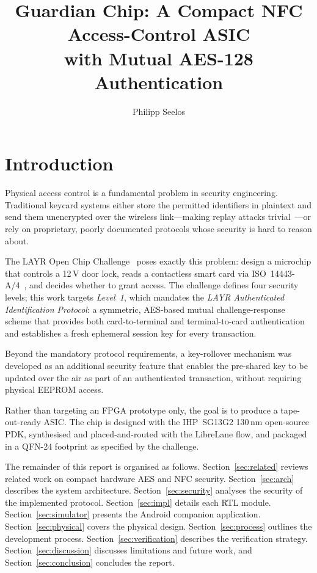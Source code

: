 \documentclass[manuscript,screen,nonacm]{acmart}
\title{Guardian Chip: A Compact NFC Access-Control ASIC\\
       with Mutual AES-128 Authentication}
\author{Philipp Seelos}
\affiliation{%
  \institution{Hochschule RheinMain}
  \country{Germany}
}
\begin{document}
\maketitle

\section{Introduction}
\label{sec:intro}

Physical access control is a fundamental problem in security engineering.
Traditional keycard systems either store the permitted identifiers in
plaintext and send them unencrypted over the wireless link—making replay
attacks trivial~\cite{hancke2005relay}—or rely on proprietary, poorly
documented protocols whose security is hard to reason about.

The LAYR Open Chip Challenge~\cite{ocdc_layr} poses exactly this problem:
design a microchip that controls a 12\,V door lock, reads a contactless
smart card via ISO~14443-A/4~\cite{iso14443-3,iso14443-4}, and decides
whether to grant access.
The challenge defines four security levels; this work targets
\emph{Level~1}, which mandates the \emph{LAYR Authenticated Identification
Protocol}: a symmetric, AES-based mutual challenge-response scheme that
provides both card-to-terminal and terminal-to-card authentication and
establishes a fresh ephemeral session key for every transaction.

Beyond the mandatory protocol requirements, a key-rollover mechanism
was developed as an additional security feature that enables the
pre-shared key to be updated over the air as part of an authenticated
transaction, without requiring physical EEPROM access.

Rather than targeting an FPGA prototype only, the goal is to produce a
tape-out-ready ASIC.
The chip is designed with the IHP~SG13G2 130\,nm open-source PDK,
synthesised and placed-and-routed with the LibreLane flow,
and packaged in a QFN-24 footprint as specified by the challenge.

The remainder of this report is organised as follows.
Section~\ref{sec:related} reviews related work on compact hardware AES
and NFC security.
Section~\ref{sec:arch} describes the system architecture.
Section~\ref{sec:security} analyses the security of the implemented
protocol.
Section~\ref{sec:impl} details each RTL module.
Section~\ref{sec:simulator} presents the Android companion application.
Section~\ref{sec:physical} covers the physical design.
Section~\ref{sec:process} outlines the development process.
Section~\ref{sec:verification} describes the verification strategy.
Section~\ref{sec:discussion} discusses limitations and future work,
and Section~\ref{sec:conclusion} concludes the report.
\end{document}
